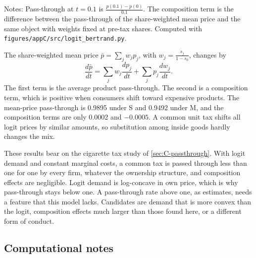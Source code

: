 \begin{table}[htbp]
\vspace{3pt}
\begin{minipage}{0.97\textwidth}
\footnotesize Notes: Pass-through at $t = 0.1$ is $\frac{p(0.1) - p(0)}{0.1}$. The composition term is the difference
between the pass-through of the share-weighted mean price and the same object with weights fixed at pre-tax shares.
Computed with \texttt{figures/appC/src/logit\_bertrand.py}.
\end{minipage}
\end{table}

The share-weighted mean price $\bar p = \sum_jw_jp_j$, with $w_j = \frac{s_j}{1 - s_0}$, changes by
\begin{equation*}
  \frac{d\bar p}{dt} = \sum_jw_j\frac{dp_j}{dt} + \sum_jp_j\frac{dw_j}{dt} .
\end{equation*}
The first term is the average product pass-through. The second is a composition term, which is positive when
consumers shift toward expensive products. The mean-price pass-through is 0.9895 under S and 0.9492 under M, and the
composition terms are only 0.0002 and $-0.0005$. A common unit tax shifts all logit prices by similar amounts, so
substitution among inside goods hardly changes the mix.

These results bear on the cigarette tax study of \cref{sec:C-passthrough}. With logit demand and constant marginal
costs, a common tax is passed through less than one for one by every firm, whatever the ownership structure, and
composition effects are negligible. Logit demand is log-concave in own price, which is why pass-through stays below
one. A pass-through rate above one, as \citet{Sumner1981} estimates, needs a feature that this model lacks. Candidates
are demand that is more convex than the logit, composition effects much larger than those found here, or a different
form of conduct.

\subsection{Computational notes}

